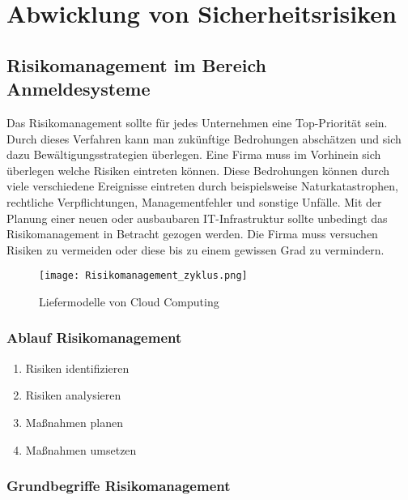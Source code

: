 \chapter{Abwicklung von Sicherheitsrisiken}

\section{Risikomanagement im Bereich Anmeldesysteme}
Das Risikomanagement sollte für jedes Unternehmen eine Top-Priorität sein. Durch dieses Verfahren kann man zukünftige Bedrohungen abschätzen und sich dazu Bewältigungsstrategien überlegen. Eine Firma muss im Vorhinein sich überlegen welche Risiken eintreten können. Diese Bedrohungen können durch viele verschiedene Ereignisse eintreten durch beispielsweise Naturkatastrophen, rechtliche Verpflichtungen, Managementfehler und sonstige Unfälle.
Mit der Planung einer neuen oder ausbaubaren IT-Infrastruktur sollte unbedingt das Risikomanagement in Betracht gezogen werden. Die Firma muss versuchen Risiken zu vermeiden oder diese bis zu einem gewissen Grad zu vermindern. 

\begin{center}
\begin{figure}[h]
    \centering
    \texttt{[image: Risikomanagement\_zyklus.png]}
    \caption{Liefermodelle von Cloud Computing}
\end{figure}
\end{center}

\newpage

\subsection{Ablauf Risikomanagement}
\begin{enumerate}
    \item Risiken identifizieren
    \item Risiken analysieren
    \item Maßnahmen planen
    \item Maßnahmen umsetzen
\end{enumerate}


\subsection{Grundbegriffe Risikomanagement}
